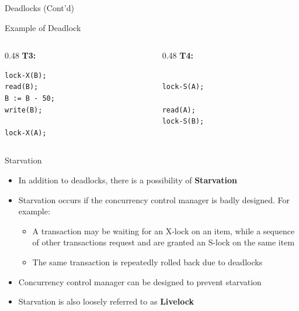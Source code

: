 \documentclass[aspectratio=169, xcolor=dvipsnames]{beamer}
\begin{document}
\begin{frame}[fragile]{Deadlocks (Cont'd)}
    \begin{exampleblock}{Example of Deadlock}
        \begin{columns}[T]
            \begin{column}{0.48\textwidth}
                \textbf{T3:}
                \begin{lstlisting}
lock-X(B);
read(B); 
B := B - 50; 
write(B); 

lock-X(A); 
                \end{lstlisting}
            \end{column}
            \begin{column}{0.48\textwidth}
                \textbf{T4:}
                \begin{lstlisting}

lock-S(A); 

read(A); 
lock-S(B);
                \end{lstlisting}
            \end{column}
        \end{columns}
    \end{exampleblock}
\end{frame}

\begin{frame}{Starvation}
    \begin{itemize}[<+->]
        \item In addition to deadlocks, there is a possibility of \textbf{Starvation}
        \item Starvation occurs if the concurrency control manager is badly designed. For example:
        \begin{itemize}
            \item[$\triangleright$] A transaction may be waiting for an X-lock on an item, while a sequence of other transactions request and are granted an S-lock on the same item
            \item[$\triangleright$] The same transaction is repeatedly rolled back due to deadlocks
        \end{itemize}
        \item Concurrency control manager can be designed to prevent starvation
        \item Starvation is also loosely referred to as \textbf{Livelock}
    \end{itemize}
\end{frame}
\end{document}
